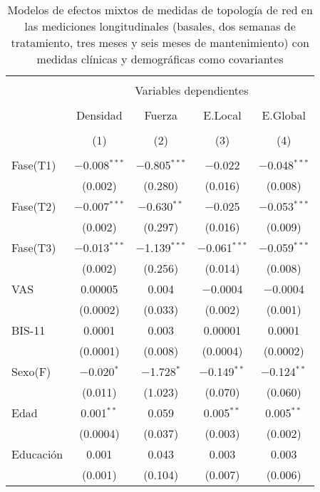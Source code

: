 \begin{table}[!htbp] \centering
    \small
  \caption{Modelos de efectos mixtos de medidas de topología de red en las mediciones longitudinales (basales, dos semanas de tratamiento, tres meses y seis meses de mantenimiento) con medidas clínicas y demográficas como covariantes}
  \label{tab:memL2}
\begin{tabular}{@{\extracolsep{5pt}}lcccc}
\\[-1.8ex]\hline
\hline \\[-1.8ex]
 & \multicolumn{4}{c}{Variables dependientes} \\
\cline{2-5}
\\[-1.8ex] & Densidad & Fuerza & E.Local & E.Global \\
\\[-1.8ex] & (1) & (2) & (3) & (4)\\
\hline \\[-1.8ex]
 Fase(T1) & $-$0.008$^{***}$ & $-$0.805$^{***}$ & $-$0.022 & $-$0.048$^{***}$ \\
  & (0.002) & (0.280) & (0.016) & (0.008) \\
  Fase(T2) & $-$0.007$^{***}$ & $-$0.630$^{**}$ & $-$0.025 & $-$0.053$^{***}$ \\
  & (0.002) & (0.297) & (0.016) & (0.009) \\
  Fase(T3) & $-$0.013$^{***}$ & $-$1.139$^{***}$ & $-$0.061$^{***}$ & $-$0.059$^{***}$ \\
  & (0.002) & (0.256) & (0.014) & (0.008) \\
  VAS & 0.00005 & 0.004 & $-$0.0004 & $-$0.0004 \\
  & (0.0002) & (0.033) & (0.002) & (0.001) \\
  BIS-11 & 0.0001 & 0.003 & 0.00001 & 0.0001 \\
  & (0.0001) & (0.008) & (0.0004) & (0.0002) \\
  Sexo(F) & $-$0.020$^{*}$ & $-$1.728$^{*}$ & $-$0.149$^{**}$ & $-$0.124$^{**}$ \\
  & (0.011) & (1.023) & (0.070) & (0.060) \\
  Edad & 0.001$^{**}$ & 0.059 & 0.005$^{**}$ & 0.005$^{**}$ \\
  & (0.0004) & (0.037) & (0.003) & (0.002) \\
  Educación & 0.001 & 0.043 & 0.003 & 0.003 \\
  & (0.001) & (0.104) & (0.007) & (0.006) \\

\end{tabular}
\end{table}
